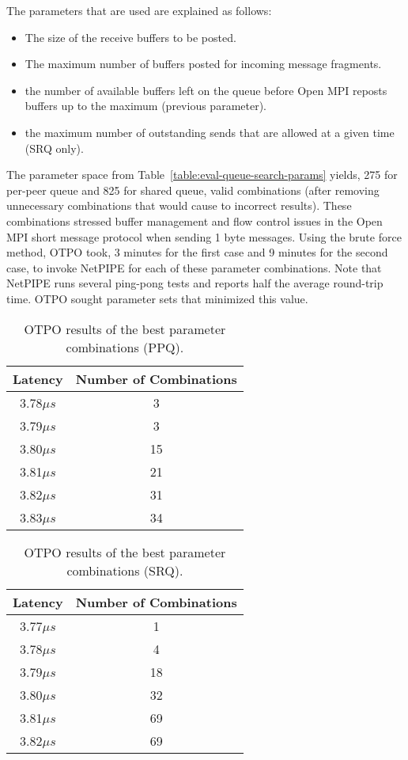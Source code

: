 The parameters that are used are explained as follows:\\
\begin{itemize}
\item The size of the receive buffers to be posted.
\item The maximum number of buffers posted for incoming message fragments.
\item the number of available buffers left on the queue before Open
  MPI reposts buffers up to the maximum (previous parameter).
\item the maximum number of outstanding sends that are allowed at a
  given time (SRQ only).
\end{itemize}

The parameter space from Table~\ref{table:eval-queue-search-params} yields,
275 for per-peer queue and 825 for shared queue, valid combinations (after
removing unnecessary combinations that would cause to incorrect
results). These combinations stressed buffer management and flow control
issues in the Open MPI short message protocol when sending 1 byte
messages. Using the brute force method, OTPO took, 3 minutes for the first
case and 9 minutes for the second case, to invoke NetPIPE for each of these
parameter combinations.  Note that NetPIPE runs several ping-pong tests and
reports half the average round-trip time.  OTPO sought parameter sets that
minimized this value.

\begin{table}[tb]
\centering
\caption{OTPO results of the best parameter combinations (PPQ).}
\label{table:results-ppq} 
\begin{tabular}{|c|c|} \hline
Latency & Number of Combinations \\
\hline
3.78$\mu s$  & 3\\
\hline
3.79$\mu s$  & 3\\
\hline
3.80$\mu s$  & 15\\
\hline
3.81$\mu s$  & 21\\
\hline
3.82$\mu s$  & 31\\
\hline
3.83$\mu s$  & 34\\
\hline
\end{tabular}  
\end{table}

\begin{table}[tb]
\centering
\caption{OTPO results of the best parameter combinations (SRQ).}
\label{table:results-srq} 
\begin{tabular}{|c|c|} \hline
Latency & Number of Combinations \\
\hline
3.77$\mu s$  & 1\\
\hline
3.78$\mu s$  & 4\\
\hline
3.79$\mu s$  & 18\\
\hline
3.80$\mu s$  & 32\\
\hline
3.81$\mu s$  & 69\\
\hline
3.82$\mu s$  & 69\\
\hline
\end{tabular}  
\end{table}

